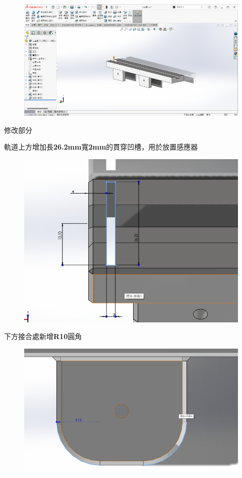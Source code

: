 \begin{figure}[h!]
    \centering
    \includegraphics[width=1\textwidth]{./../images/6-1-19.png}
\end{figure}

\noindent 修改部分

\noindent 軌道上方增加長\textbf{26.2mm}寬\textbf{2mm}的貫穿凹槽，用於放置感應器

\begin{figure}[h!]
    \centering
    \includegraphics[width=1\textwidth]{./../images/6-1-20.png}
\end{figure}

\noindent 下方接合處新增\textbf{R10}圓角

\begin{figure}[h!]
    \centering
    \includegraphics[width=1\textwidth]{./../images/6-1-21.png}
\end{figure}

